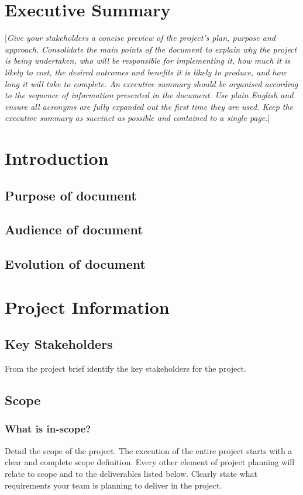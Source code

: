 \documentclass{report}
\begin{document}
\chapter*{Executive Summary}\label{sec:ESummary}
[\textit{Give your stakeholders a concise preview of the project’s plan, purpose and approach. Consolidate the main points of the document to explain why the project is being undertaken, who will be responsible for implementing it, how much it is likely to cost, the desired outcomes and benefits it is likely to produce, and how long it will take to complete. An executive summary should be organised according to the sequence of information presented in the document. Use plain English and ensure all acronyms are fully expanded out the first time they are used. Keep the executive summary as succinct as possible and contained to a single page.}]
\pagebreak
\clearpage

\tableofcontents
\pagebreak

\chapter{Introduction}
\section{Purpose of document}
\section{Audience of document}
\section{Evolution of document}

\chapter{Project Information}
\section{Key Stakeholders}
From the project brief identify the key stakeholders for the project.

\section{Scope}
\subsection{What is in-scope?}
Detail the scope of the project. The execution of the entire project starts with a clear and complete scope definition. Every other element of project planning will relate to scope and to the deliverables listed below. Clearly state what requirements your team is planning to deliver in the project.
\end{document}
